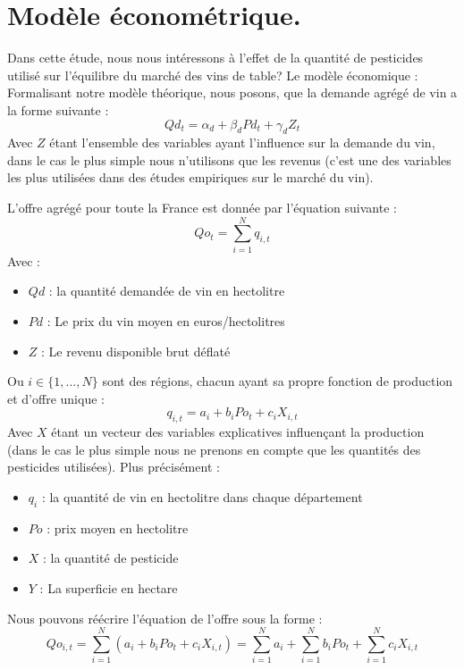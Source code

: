 \documentclass[11pt, a4paper]{article}
\begin{document}
\section*{Modèle économétrique.}
Dans cette étude, nous nous intéressons à l’effet de la quantité de pesticides utilisé sur l’équilibre du marché des vins de table?
Le modèle économique :
Formalisant notre modèle théorique, nous posons, que la demande agrégé de vin a la forme suivante :
\begin{equation}
    Qd_t = \alpha_d + \beta_d Pd_t + \gamma_d Z_t
\end{equation}
Avec $Z$ étant l'ensemble des variables ayant l'influence sur la demande du vin, dans le cas le plus simple nous n'utilisons que les revenus (c'est une des variables les plus utilisées dans des études empiriques sur le marché du vin).
\par
L'offre agrégé pour toute la France est donnée par l'équation suivante : 
\begin{equation}
    Qo_t = \sum_{i = 1}^{N} q_{i,t}
\end{equation}
Avec :
\begin{itemize}
  \item $Qd$ : la quantité demandée de vin en hectolitre
  \item $Pd$ : Le prix du vin moyen en euros/hectolitres
  \item $Z$ : Le revenu disponible brut déflaté
\end{itemize}
Ou $i \in \{1, ..., N\}$ sont des régions, chacun ayant sa propre fonction de production et d'offre unique : 
\begin{equation}
    q_{i,t} = a_i + b_i Po_t + c_i X_{i,t}
\end{equation}
Avec $X$ étant un vecteur des variables explicatives influençant la production (dans le cas le plus simple nous ne prenons en compte que les quantités des pesticides utilisées).
Plus précisément :
\begin{itemize}
  \item $q_i$ : la quantité de vin en hectolitre dans chaque département
  \item $Po$ : prix moyen en hectolitre
  \item $X$ : la quantité de pesticide
  \item $Y$ : La superficie en hectare
\end{itemize}
Nous pouvons réécrire l'équation de l'offre sous la forme :
\begin{equation}
    Qo_{i,t} = \sum_{i = 1}^{N} (a_i + b_i Po_{t} + c_i X_{i,t}) = \sum_{i = 1}^{N} a_i + \sum_{i = 1}^{N} b_i Po_{t} + \sum_{i = 1}^{N} c_i X_{i,t}
\end{equation}
\end{document}
